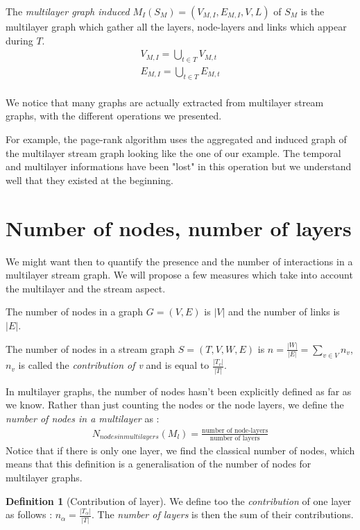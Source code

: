 \documentclass[dvipsnames,a4paper,11pt]{article}
\theoremstyle{definition}
\newtheorem{defn}{Definition}
\theoremstyle{remark}
\theoremstyle{remark}
\begin{document}
    
    The {\em multilayer graph induced} $M_I(S_M) = (V_{M,I}, E_{M,I}, V,L)$ of $S_M$ is the multilayer graph which gather all the layers, node-layers and links which appear during $T$.
    \begin{align*}
    	V_{M,I} = \bigcup_{t\in T} V_{M,t}\\
    	E_{M,I} = \bigcup_{t\in T} E_{M,t}\\
    \end{align*}
    
	
	We notice that many graphs are actually extracted from multilayer stream graphs, with the different operations we presented.	
	
	For example, the page-rank algorithm uses the aggregated and induced graph of the multilayer stream graph looking like the one of our example. The temporal and multilayer informations have been "lost" in this operation but we understand well that they existed at the beginning.
	
	
	\section{Number of nodes, number of layers}
	
	We might want then to quantify the presence and the number of interactions in a multilayer stream graph. We will propose a few measures which take into account the multilayer and the stream aspect.
	
	The number of nodes in a graph $G=(V,E)$ is $|V|$ and the number of links is $|E|$.
	
	The number of nodes in a stream graph $S=(T,V,W,E)$ is $n=\frac{|W|}{|E|}=\sum_{v\in V} n_v$, $n_v$ is called the {\em contribution of v} and is equal to $\frac{|T_v|}{|T|}$.
	
	In multilayer graphs, the number of nodes hasn't been explicitly defined as far as we know.
	Rather than just counting the nodes or the node layers, we define the {\em number of nodes in a multilayer} as :
	\begin{align*}
		N_{nodes in multilayers}(M_l) = \frac{\text{number of node-layers}}{\text{number of layers}}
	\end{align*}	    
	Notice that if there is only one layer, we find the classical number of nodes, which means that this definition is a generalisation of the number of nodes for multilayer graphs.
		
	
	\begin{defn}[Contribution of layer]
	We define too the {\em contribution} of one layer as follows : $n_\alpha = \frac{|T_{\alpha}|}{|T|}$. The {\em number of layers} is then the sum of their contributions.
    \end{defn}
	
\end{document}
